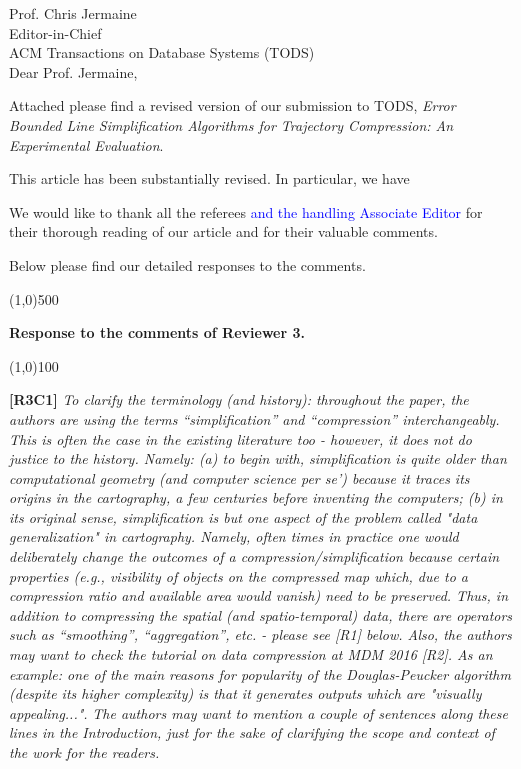 \documentclass{letter}
\begin{document}
Prof. {Chris Jermaine} \\
Editor-in-Chief		\\
ACM Transactions on Database Systems (TODS)	\\



Dear Prof. Jermaine,

Attached please find a revised version of our submission to TODS, \emph{Error Bounded Line Simplification Algorithms for Trajectory Compression: An Experimental Evaluation}.


 This article has been substantially revised. In particular, we have



We would like to thank all the referees \textcolor{blue}{and the handling Associate Editor} for their thorough reading of our article and for their valuable comments.

Below please find our detailed responses to the comments.





\line(1,0){500}

\textbf{Response to the comments of Reviewer 3.}

\line(1,0){100}

\textbf{[R3C1]} \emph{
To clarify the terminology (and history): throughout the paper, the authors are using the terms ``simplification'' and ``compression'' interchangeably. This is often the case in the existing literature too - however, it does not do justice to the history. Namely: (a) to begin with, simplification is quite older than computational geometry (and computer science per se') because it traces its origins in the cartography, a few centuries before inventing the computers; (b) in its original sense, simplification is but one aspect of the problem called "data generalization" in cartography. Namely, often times in practice one would deliberately change the outcomes of a compression/simplification because certain properties (e.g., visibility of objects on the compressed map which, due to a compression ratio and available area would vanish) need to be preserved. Thus, in addition to compressing the spatial (and spatio-temporal) data, there are operators such as ``smoothing'', ``aggregation'', etc. - please see [R1] below. Also, the authors may want to check the tutorial on data compression at MDM 2016 [R2]. As an example: one of the main reasons for popularity of the Douglas-Peucker algorithm (despite its higher complexity) is that it generates outputs which are "visually appealing...".}
%
\emph{The authors may want to mention a couple of sentences along these lines in the Introduction, just for the sake of clarifying the scope and context of the work for the readers.}
\end{document}
